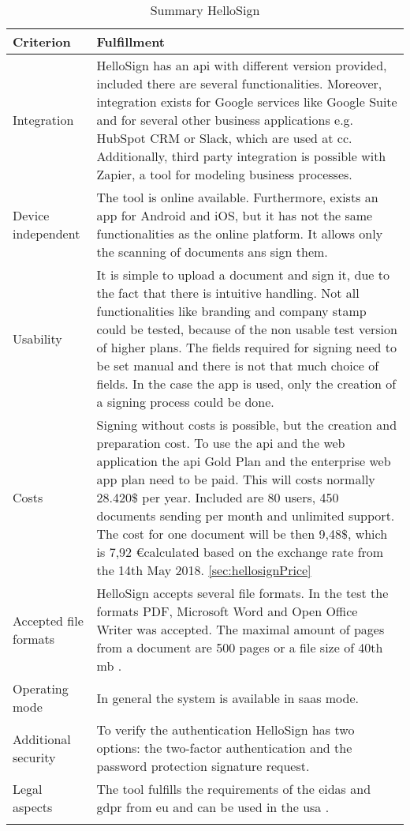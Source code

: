 	\begin{longtable}{|p{4cm}|p{10cm}|} \hline
		\rowcolor{Gray}Criterion & Fulfillment \\ \hline
		Integration & HelloSign has an \gls{api} with different version provided, included there are several functionalities. Moreover, integration exists for Google services like Google Suite and for several other business applications e.g. HubSpot CRM or Slack, which are used at \gls{cc}. Additionally, third party integration is possible with Zapier, a tool for modeling business processes. \parencite{hellosign2018integration,hellosign2018api}\\ \hline
		Device independent & The tool is online available. Furthermore, exists an \gls{app} for Android and iOS, but it has not the same functionalities as the online platform. It allows only the scanning of documents ans sign them. \parencite{hellosign2018legal}\\ \hline
		Usability & It is simple to upload a document and sign it, due to the fact that there is intuitive handling. Not all functionalities like branding and company stamp could be tested, because of the non usable test version of higher plans. The fields required for signing need to be set manual and there is not that much choice of fields. In the case the \gls{app} is used, only the creation of a signing process could be done.\\ \hline
		Costs &  Signing without costs is possible, but the creation and preparation cost. To use the \gls{api} and the web application the \gls{api} Gold Plan and the enterprise web app plan need to be paid. This will costs normally 28.420\$ per year. Included are 80 users, 450 documents sending per month and unlimited support. The cost for one document will be then 9,48\$, which is 7,92 \euro calculated based on the exchange rate from the 14th May 2018.  \ref{sec:hellosignPrice} \\ \hline
		Accepted file formats & HelloSign accepts several file formats. In the test the formats \gls{PDF}, Microsoft Word and Open Office Writer was accepted. The maximal amount of pages from a document are 500 pages or a file size of 40th \gls{mb} \parencite{hellosign2018documents}.\\ \hline
		Operating mode & In general the system is available in \gls{saas} mode. \parencite{hellosign2018features} \\ \hline
		Additional security & To verify the authentication HelloSign has two options: the two-factor authentication and the password protection signature request.\parencite{hellosign2018security} \\ \hline
		Legal aspects & The tool fulfills the requirements of the \gls{eidas} and \gls{gdpr} from \gls{eu} and can be used in the \gls{usa} \parencite{hellosign2018legal,hellosign2018compliance}. \\ \hline
	\caption{Summary HelloSign}
	\label{tab:hellosign}
	\end{longtable}

